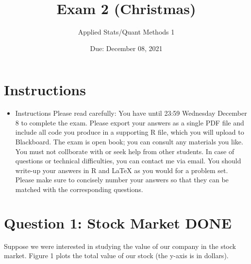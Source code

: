 \documentclass[12pt,letterpaper]{article}
\title{Exam 2 (Christmas)}
\date{Due: December 08, 2021}
\author{Applied Stats/Quant Methods 1}
\begin{document}
	\maketitle
	\section*{Instructions}
	\begin{itemize}
		\item Instructions
		Please read carefully: You have until 23:59 Wednesday December 8 to complete
		the exam. Please export your answers as a single PDF file and include all code you
		produce in a supporting R file, which you will upload to Blackboard. The exam is
		open book; you can consult any materials you like. You must not collborate with
		or seek help from other students. In case of questions or technical difficulties, you
		can contact me via email. You should write-up your answers in R and LaTeX as you
		would for a problem set. Please make sure to concisely number your answers so that
		they can be matched with the corresponding questions. 
		
		
	\end{itemize}
	
	
	\newpage
	
		\vspace{.5cm}
	\section*{Question 1: Stock Market DONE}
	Suppose we were interested in studying the value of our company in the stock market. Figure
	1 plots the total value of our stock (the y-axis is in dollars).
	
\end{document}
